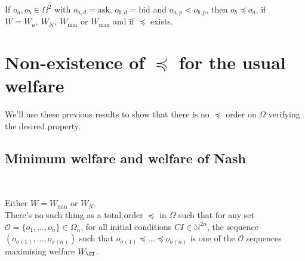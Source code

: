 \documentclass[a4paper]{article}
\newcommand{\N}{\mathbb{N}}
\newcommand{\Oc}{\mathcal{O}}
\newtheorem[style=S, bodystyle=\noindent]{thm}{Theorem}[section]
\newtheorem[style=S, bodystyle=\noindent]{defn}[thm]{Definition}
\newtheorem[style=S, bodystyle=\noindent]{propo}[thm]{Proposition}
\newtheorem[style=S, bodystyle=\noindent]{prop}[thm]{Property}
\newtheorem[style=S, bodystyle=\noindent]{coro}[thm]{Corollary}
\newtheorem[style=S, bodystyle=\noindent]{lem}[thm]{Lemma}
\newtheorem[style=S, headstyle=\bfseries\boldmath Theorem, bodystyle=\noindent]{thm*}{Theorem}
\newtheorem[style=S, headstyle=\bfseries\boldmath Definition, bodystyle=\noindent]{defn*}{Definition}
\newtheorem[style=S, headstyle=\bfseries\boldmath Proposition, bodystyle=\noindent]{propo*}{Proposition}
\newtheorem[style=S, headstyle=\bfseries\boldmath Property, bodystyle=\noindent]{prop*}{Property}
\newtheorem[style=S, headstyle=\bfseries\boldmath Corollary, bodystyle=\noindent]{coro*}{Corollary}
\newtheorem[style=S, headstyle=\bfseries\boldmath Lemma, bodystyle=\noindent]{lem*}{Lemma}
\begin{document}
\begin{prop}
	\label{prop2}
	If $o_a, o_b \in \Omega^2$ with $o_{a, d} = \text{ask}$, $o_{b, d} = \text{bid}$ and $o_{a, p} < o_{b,p}$, then $o_b \preceq o_a$, if $W = W_u,~W_N,~W_{\min}$ or $W_{\max}$ and if $\preceq$ exists.
\end{prop}


\section{Non-existence of $\preceq$ for the usual welfare}

We'll use these previous results to show that there is no $\preceq$ order on $\Omega$ verifying the desired property.

\subsection{Minimum welfare and welfare of Nash}
~
\begin{thm}
	\label{thm1}
	Either $W = W_{\min}$ or $W_N$. \\
	There's no such thing as a total order $\preceq$ in $\Omega$ such that for any set $\Oc = \{o_1, \ldots, o_n\} \in \Omega_n$, for all initial conditions $CI \in \N^{2n}$, the sequence $(o_{\sigma(1)}, \ldots, o_{\sigma(n)})$ such that $o_{\sigma(1)} \preceq \ldots \preceq o_{\sigma(n)}$ is one of the $\Oc$ sequences maximising welfare $W_{\CI}$.


\end{thm}
\end{document}
